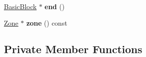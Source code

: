 \begin{DoxyCompactItemize}
\item 
\hyperlink{classv8_1_1internal_1_1compiler_1_1_basic_block}{Basic\+Block} $\ast$ {\bfseries end} ()\hypertarget{classv8_1_1internal_1_1compiler_1_1_schedule_a3c3967add3df64ec380f3e06644e1b2c}{}\label{classv8_1_1internal_1_1compiler_1_1_schedule_a3c3967add3df64ec380f3e06644e1b2c}

\item 
\hyperlink{classv8_1_1internal_1_1_zone}{Zone} $\ast$ {\bfseries zone} () const \hypertarget{classv8_1_1internal_1_1compiler_1_1_schedule_ab5abe9040f92af36e36bb6c49aea7215}{}\label{classv8_1_1internal_1_1compiler_1_1_schedule_ab5abe9040f92af36e36bb6c49aea7215}

\end{DoxyCompactItemize}
\subsection*{Private Member Functions}
